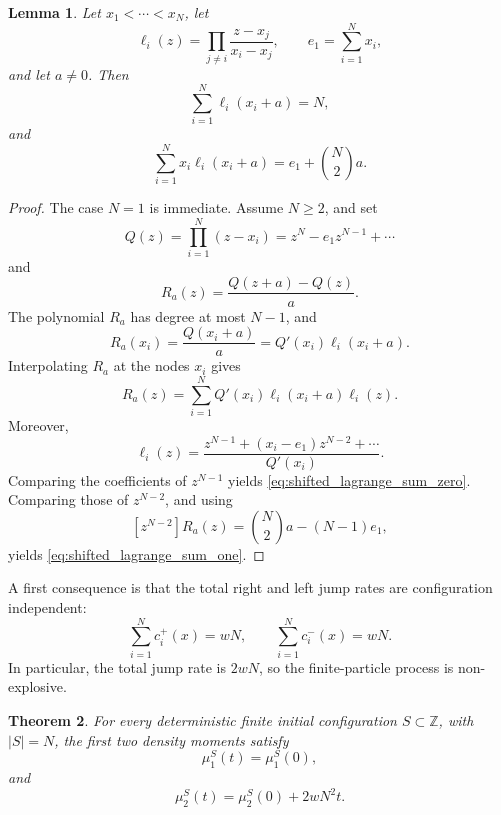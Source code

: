 \documentclass[11pt]{article}
\numberwithin{equation}{section}
\newtheorem{theorem}{Theorem}[section]
\newtheorem{lemma}[theorem]{Lemma}
\newcommand{\1}{\mathbf 1}
\begin{document}
\begin{lemma}
\label{lem:shifted_interpolation_sums}
Let \(x_1<\cdots<x_N\), let
\[
    \ell_i(z)=\prod_{j\neq i}\frac{z-x_j}{x_i-x_j},
    \qquad
    e_1=\sum_{i=1}^Nx_i,
\]
and let \(a\neq0\).  Then
\begin{equation}
    \sum_{i=1}^N\ell_i(x_i+a)=N,
    \label{eq:shifted_lagrange_sum_zero}
\end{equation}
and
\begin{equation}
    \sum_{i=1}^Nx_i\ell_i(x_i+a)
    =
    e_1+\binom{N}{2}a.
    \label{eq:shifted_lagrange_sum_one}
\end{equation}
\end{lemma}

\begin{proof}
The case \(N=1\) is immediate.  Assume \(N\geq2\), and set
\[
    Q(z)=\prod_{i=1}^N(z-x_i)
    =z^N-e_1z^{N-1}+\cdots
\]
and
\[
    R_a(z)=\frac{Q(z+a)-Q(z)}{a}.
\]
The polynomial \(R_a\) has degree at most \(N-1\), and
\[
    R_a(x_i)=\frac{Q(x_i+a)}{a}
    =Q'(x_i)\ell_i(x_i+a).
\]
Interpolating \(R_a\) at the nodes \(x_i\) gives
\[
    R_a(z)
    =
    \sum_{i=1}^NQ'(x_i)\ell_i(x_i+a)\ell_i(z).
\]
Moreover,
\[
    \ell_i(z)
    =
    \frac{z^{N-1}+(x_i-e_1)z^{N-2}+\cdots}{Q'(x_i)}.
\]
Comparing the coefficients of \(z^{N-1}\) yields
\eqref{eq:shifted_lagrange_sum_zero}.  Comparing those of \(z^{N-2}\), and
using
\[
    [z^{N-2}]R_a(z)
    =
    \binom{N}{2}a-(N-1)e_1,
\]
yields \eqref{eq:shifted_lagrange_sum_one}.
\end{proof}

A first consequence is that the total right and left jump rates are
configuration independent:
\begin{equation}
    \sum_{i=1}^Nc_i^+(x)=wN,
    \qquad
    \sum_{i=1}^Nc_i^-(x)=wN.
    \label{eq:total_left_right_rates}
\end{equation}
In particular, the total jump rate is \(2wN\), so the finite-particle process
is non-explosive.

\begin{theorem}
\label{thm:moment_identities}
For every deterministic finite initial configuration
\(S\subset\mathbb Z\), with \(|S|=N\), the first two density moments satisfy
\begin{equation}
    \mu_1^S(t)=\mu_1^S(0),
    \label{eq:first_moment_identity}
\end{equation}
and
\begin{equation}
    \mu_2^S(t)=\mu_2^S(0)+2wN^2t.
    \label{eq:second_moment_identity}
\end{equation}
\end{theorem}
\end{document}
